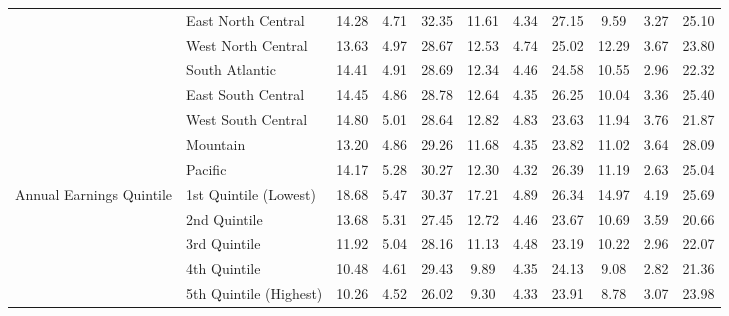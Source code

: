 \begin{tabular}{llccc|ccc|ccc}
&East North Central&14.28&4.71&32.35&11.61&4.34&27.15&9.59&3.27&25.10\\
&West North Central&13.63&4.97&28.67&12.53&4.74&25.02&12.29&3.67&23.80\\
&South Atlantic&14.41&4.91&28.69&12.34&4.46&24.58&10.55&2.96&22.32\\
&East South Central&14.45&4.86&28.78&12.64&4.35&26.25&10.04&3.36&25.40\\
&West South Central&14.80&5.01&28.64&12.82&4.83&23.63&11.94&3.76&21.87\\
&Mountain&13.20&4.86&29.26&11.68&4.35&23.82&11.02&3.64&28.09\\
&Pacific&14.17&5.28&30.27&12.30&4.32&26.39&11.19&2.63&25.04\\
Annual Earnings Quintile&1st Quintile (Lowest)&18.68&5.47&30.37&17.21&4.89&26.34&14.97&4.19&25.69\\
&2nd Quintile&13.68&5.31&27.45&12.72&4.46&23.67&10.69&3.59&20.66\\
&3rd Quintile&11.92&5.04&28.16&11.13&4.48&23.19&10.22&2.96&22.07\\
&4th Quintile&10.48&4.61&29.43&9.89&4.35&24.13&9.08&2.82&21.36\\
&5th Quintile (Highest)&10.26&4.52&26.02&9.30&4.33&23.91&8.78&3.07&23.98\\
\hline\hline
\end{tabular}
